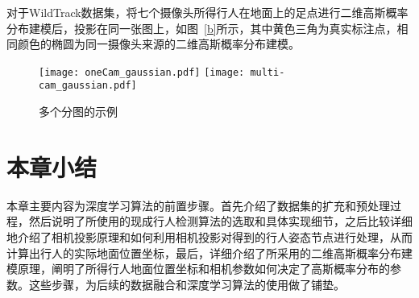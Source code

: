 对于WildTrack数据集，将七个摄像头所得行人在地面上的足点进行二维高斯概率分布建模后，投影在同一张图上，如图~\ref{b}所示，其中黄色三角为真实标注点，相同颜色的椭圆为同一摄像头来源的二维高斯概率分布建模。
\begin{figure}
  \centering
  \subcaptionbox{\label{a}}
    {\texttt{[image: oneCam\_gaussian.pdf]}}
  \subcaptionbox{\label{b}}
    {\texttt{[image: multi-cam\_gaussian.pdf]}}
  \caption{多个分图的示例}
  \label{gaussian}
\end{figure}


\section{本章小结}

本章主要内容为深度学习算法的前置步骤。首先介绍了数据集的扩充和预处理过程，然后说明了所使用的现成行人检测算法的选取和具体实现细节，之后比较详细地介绍了相机投影原理和如何利用相机投影对得到的行人姿态节点进行处理，从而计算出行人的实际地面位置坐标，最后，详细介绍了所采用的二维高斯概率分布建模原理，阐明了所得行人地面位置坐标和相机参数如何决定了高斯概率分布的参数。这些步骤，为后续的数据融合和深度学习算法的使用做了铺垫。